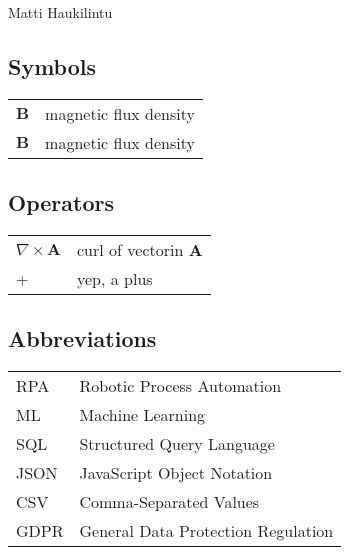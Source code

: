 \documentclass[english, 12pt, a4paper, elec, utf8, a-1b, online]{aaltothesis}
\begin{document}
\vspace{5mm}
{\hfill Matti Haukilintu \hspace{1cm}}

\newpage


\thesistableofcontents



\subsection*{Symbols}

\begin{tabular}{ll}
  $\mathbf{B}$  & magnetic flux density  \\
  $\mathbf{B}$  & magnetic flux density
\end{tabular}

\subsection*{Operators}

\begin{tabular}{ll}
  $\nabla \times \mathbf{A}$    & curl of vectorin $\mathbf{A}$\\
  +     &  yep, a plus
\end{tabular}

\subsection*{Abbreviations}

\begin{tabular}{ll}
  RPA         & Robotic Process Automation \\
  ML          & Machine Learning \\
  SQL         & Structured Query Language \\
  JSON        & JavaScript Object Notation \\
  CSV         & Comma-Separated Values \\
  GDPR        & General Data Protection Regulation
\end{tabular}




\cleardoublepage
\end{document}
